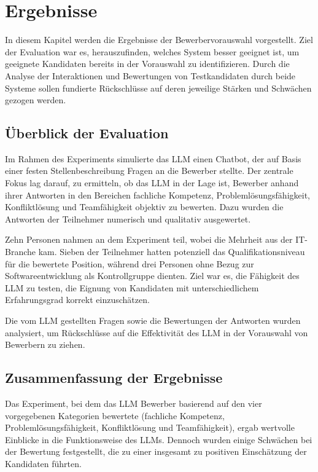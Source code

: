 
\chapter{Ergebnisse}

In diesem Kapitel werden die Ergebnisse der Bewerbervorauswahl vorgestellt. Ziel der Evaluation war es, herauszufinden, welches System besser geeignet ist, um geeignete Kandidaten bereits in der Vorauswahl zu identifizieren. Durch die Analyse der Interaktionen und Bewertungen von Testkandidaten durch beide Systeme sollen fundierte Rückschlüsse auf deren jeweilige Stärken und Schwächen gezogen werden.

\section{Überblick der Evaluation}

Im Rahmen des Experiments simulierte das \ac{LLM} einen Chatbot, der auf Basis einer festen Stellenbeschreibung Fragen an die Bewerber stellte. Der zentrale Fokus lag darauf, zu ermitteln, ob das \ac{LLM} in der Lage ist, Bewerber anhand ihrer Antworten in den Bereichen fachliche Kompetenz, Problemlösungsfähigkeit, Konfliktlösung und Teamfähigkeit objektiv zu bewerten. Dazu wurden die Antworten der Teilnehmer numerisch und qualitativ ausgewertet.

Zehn Personen nahmen an dem Experiment teil, wobei die Mehrheit aus der IT-Branche kam. Sieben der Teilnehmer hatten potenziell das Qualifikationsniveau für die bewertete Position, während drei Personen ohne Bezug zur Softwareentwicklung als Kontrollgruppe dienten. Ziel war es, die Fähigkeit des \ac{LLM} zu testen, die Eignung von Kandidaten mit unterschiedlichem Erfahrungsgrad korrekt einzuschätzen.

Die vom \ac{LLM} gestellten Fragen sowie die Bewertungen der Antworten wurden analysiert, um Rückschlüsse auf die Effektivität des \ac{LLM} in der Vorauswahl von Bewerbern zu ziehen.

\section{Zusammenfassung der Ergebnisse}

Das Experiment, bei dem das \ac{LLM} Bewerber basierend auf den vier vorgegebenen Kategorien bewertete (fachliche Kompetenz, Problemlösungsfähigkeit, Konfliktlösung und Teamfähigkeit), ergab wertvolle Einblicke in die Funktionsweise des LLMs. Dennoch wurden einige Schwächen bei der Bewertung festgestellt, die zu einer insgesamt zu positiven Einschätzung der Kandidaten führten.

